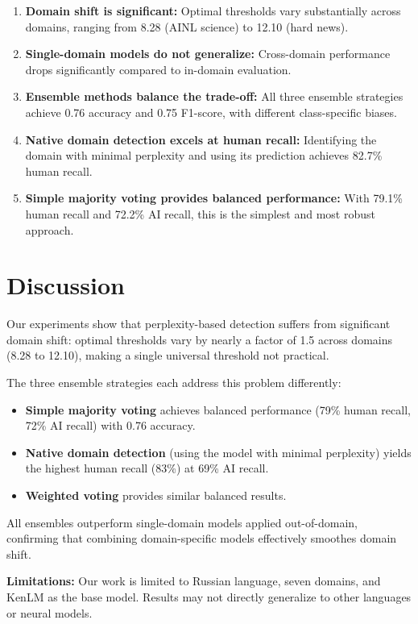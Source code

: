 \documentclass{article}
\begin{document}
\begin{enumerate}
    \item \textbf{Domain shift is significant:} Optimal thresholds vary substantially across domains, ranging from 8.28 (AINL science) to 12.10 (hard news).
    \item \textbf{Single-domain models do not generalize:} Cross-domain performance drops significantly compared to in-domain evaluation.
    \item \textbf{Ensemble methods balance the trade-off:} All three ensemble strategies achieve 0.76 accuracy and 0.75 F1-score, with different class-specific biases.
    \item \textbf{Native domain detection excels at human recall:} Identifying the domain with minimal perplexity and using its prediction achieves 82.7\% human recall.
    \item \textbf{Simple majority voting provides balanced performance:} With 79.1\% human recall and 72.2\% AI recall, this is the simplest and most robust approach.
\end{enumerate}


\section{Discussion}

Our experiments show that perplexity-based detection suffers from significant domain shift: optimal thresholds vary by nearly a factor of 1.5 across domains (8.28 to 12.10), making a single universal threshold not practical.

The three ensemble strategies each address this problem differently:
\begin{itemize}
    \item \textbf{Simple majority voting} achieves balanced performance (79\% human recall, 72\% AI recall) with 0.76 accuracy.
    \item \textbf{Native domain detection} (using the model with minimal perplexity) yields the highest human recall (83\%) at 69\% AI recall.
    \item \textbf{Weighted voting} provides similar balanced results.
\end{itemize}

All ensembles outperform single-domain models applied out-of-domain, confirming that combining domain-specific models effectively smoothes domain shift.

\textbf{Limitations:} Our work is limited to Russian language, seven domains, and KenLM as the base model. Results may not directly generalize to other languages or neural models.
\end{document}
